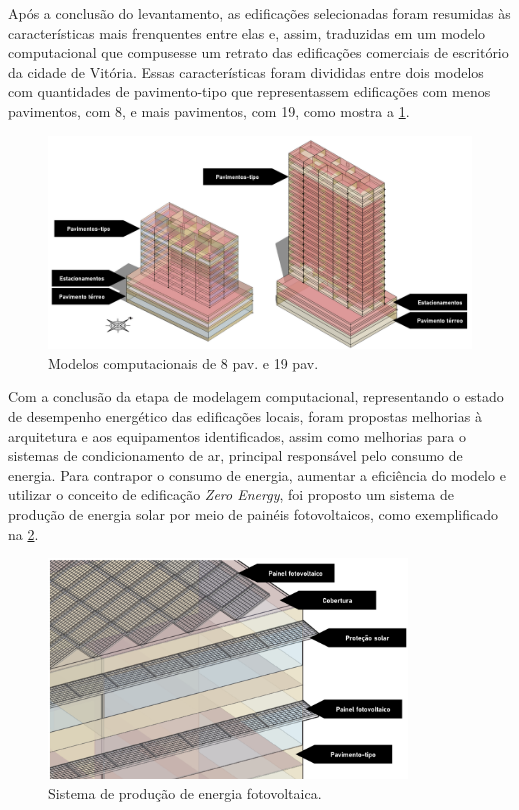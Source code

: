 \begin{onehalfspace}
    \noindent Após a conclusão do levantamento, as edificações selecionadas foram resumidas às
    características mais frenquentes entre elas e, assim, traduzidas em um modelo computacional
    que compusesse um retrato das edificações comerciais de escritório da cidade de Vitória.
    Essas características foram divididas entre dois modelos com quantidades de pavimento-tipo
    que representassem edificações com menos pavimentos, com 8, e mais pavimentos, com 19, como
    mostra a \ref{fig:2}.
    \begin{figure}[H]
        \label{fig:2}
        \centering
        \includegraphics[width=1\textwidth]{figures/fig11_8-19-2pav.png}
        \caption{\small Modelos computacionais de 8 pav. e 19 pav.}
    \end{figure}

    \noindent Com a conclusão da etapa de modelagem computacional, representando o estado de desempenho
    energético das edificações locais, foram propostas melhorias à arquitetura e aos equipamentos
    identificados, assim como melhorias para o sistemas de condicionamento de ar, principal
    responsável pelo consumo de energia. Para contrapor o consumo de energia, aumentar a
    eficiência do modelo e utilizar o conceito de edificação \textit{Zero Energy}, foi proposto
    um sistema de produção de energia solar por meio de painéis fotovoltaicos, como exemplificado
    na \ref{fig:3}.
    \begin{figure}[H]
        \label{fig:3}
        \centering
        \includegraphics[width=0.85\textwidth]{figures/paineis pv.png}
        \caption{\small Sistema de produção de energia fotovoltaica.}
    \end{figure}


\end{onehalfspace}
